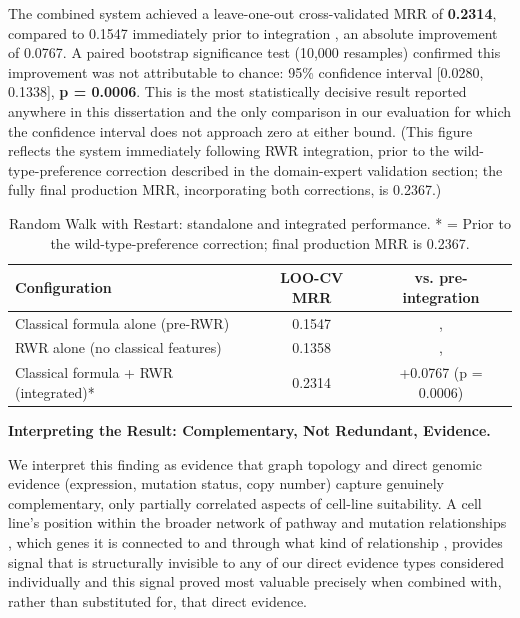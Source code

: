 \documentclass[author={Karen Coutinho, Ishaan Bhalla, Aman Raj, Dixit Kaloorani Malarmannan},
                supervisor={Dr. Daniel D'Andrea},
                degree={MSc},
                title={CellSelector Omics: A Multi-Omics Recommendation System for Cell Line Selection},
                subtitle={},
                type={},
                year={2026}]{dissertation}
\begin{document}
The combined system achieved a leave-one-out cross-validated MRR of \textbf{0.2314}, compared to 0.1547 immediately prior to integration , an absolute improvement of 0.0767. A paired bootstrap significance test (10,000 resamples) confirmed this improvement was not attributable to chance: 95\% confidence interval [0.0280, 0.1338], \textbf{p = 0.0006}. This is the most statistically decisive result reported anywhere in this dissertation and the only comparison in our evaluation for which the confidence interval does not approach zero at either bound. (This figure reflects the system immediately following RWR integration, prior to the wild-type-preference correction described in the domain-expert validation section; the fully final production MRR, incorporating both corrections, is 0.2367.)

\begin{table}[t]
\centering
\small
\begin{tabular}{|l|c|c|}
\hline
{\bf Configuration} & {\bf LOO-CV MRR} & {\bf vs. pre-integration} \\
\hline
Classical formula alone (pre-RWR) & 0.1547 & , \\
RWR alone (no classical features) & 0.1358 & , \\
Classical formula + RWR (integrated)* & 0.2314 & +0.0767 (p = 0.0006) \\
\hline
\end{tabular}
\caption{Random Walk with Restart: standalone and integrated performance. * = Prior to the wild-type-preference correction; final production MRR is 0.2367.}
\label{tab:rwr-performance}
\end{table}

{\bf Interpreting the Result: Complementary, Not Redundant, Evidence.}

We interpret this finding as evidence that graph topology and direct genomic evidence (expression, mutation status, copy number) capture genuinely complementary, only partially correlated aspects of cell-line suitability. A cell line's position within the broader network of pathway and mutation relationships , which genes it is connected to and through what kind of relationship , provides signal that is structurally invisible to any of our direct evidence types considered individually and this signal proved most valuable precisely when combined with, rather than substituted for, that direct evidence.
\end{document}
